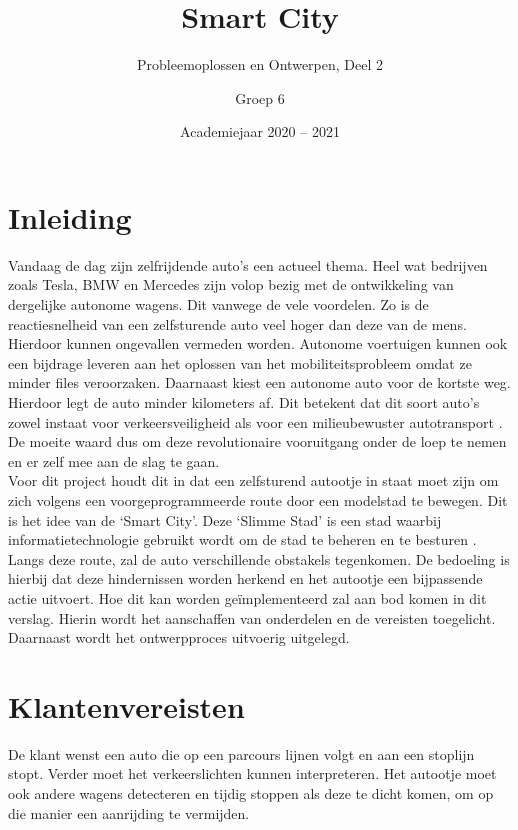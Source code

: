 \documentclass[a4paper,twoside,kulak]{kulakreport} %
\title{Smart City}
\subtitle{Probleemoplossen en Ontwerpen, Deel 2}
\author{Groep 6}
\institute {Aaron Vandenberghe, Dieter Demuynck, Jolien Barbier\\  
	Mathis Bossuyt, Rani Jans en Sarah De Meester \\~\\ 
	o.l.v. Benjamin Maveau Kevin Truyaert en Martijn Boussé}
\date{Academiejaar 2020 -- 2021}
\begin{document}

\titlepage 
\tableofcontents
\renewcommand\thesection{\arabic{section}}
\renewcommand\thesubsection{\thesection.\arabic{subsection}}
\newpage
\section*{Inleiding}\label{Inleiding}
Vandaag de dag zijn zelfrijdende auto's een actueel thema. Heel wat bedrijven zoals Tesla, BMW en Mercedes zijn volop bezig met de ontwikkeling van dergelijke autonome wagens. Dit vanwege de vele voordelen. Zo is de reactiesnelheid van een zelfsturende auto veel hoger dan deze van de mens. Hierdoor kunnen ongevallen vermeden worden. Autonome voertuigen kunnen ook een bijdrage leveren aan het oplossen van het mobiliteitsprobleem omdat ze minder files veroorzaken. Daarnaast kiest een autonome auto voor de kortste weg. Hierdoor legt de auto minder kilometers af. Dit betekent dat dit soort auto's zowel instaat voor verkeersveiligheid als voor een milieubewuster autotransport \cite{AutonomeAutos1, AutonomeAutos2}. De moeite waard dus om deze revolutionaire vooruitgang onder de loep te nemen en er zelf mee aan de slag te gaan.\\
Voor dit project houdt dit in dat een zelfsturend autootje in staat moet zijn om zich volgens een voorgeprogrammeerde route door een modelstad te bewegen. Dit is het idee van de `Smart City'. Deze `Slimme Stad' is een stad waarbij informatietechnologie gebruikt wordt om de stad te beheren en te besturen \cite{SmartCity}. Langs deze route, zal de auto verschillende obstakels tegenkomen. De bedoeling is hierbij dat deze hindernissen worden herkend en het autootje een bijpassende actie uitvoert. Hoe dit kan worden geïmplementeerd zal aan bod komen in dit verslag. Hierin wordt het aanschaffen van onderdelen en de vereisten toegelicht. Daarnaast wordt het ontwerpproces uitvoerig uitgelegd. 


\section{Klantenvereisten} \label{Klantenvereisten}
De klant wenst een auto die op een parcours lijnen volgt en aan een stoplijn stopt. Verder moet het verkeerslichten kunnen interpreteren. Het autootje moet ook andere wagens detecteren en tijdig stoppen als deze te dicht komen, om op die manier een aanrijding te vermijden. 
\end{document}
